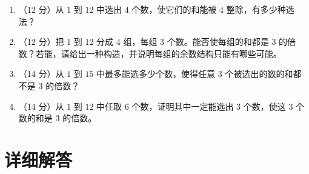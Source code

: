 \documentclass[11pt,a4paper,fontset=fandol]{ctexart}
\newcommand{\biganswerspace}{\vspace{3.2cm}}
\begin{document}
\begin{enumerate}
  \item （12 分）从 $1$ 到 $12$ 中选出 $4$ 个数，使它们的和能被 $4$ 整除，有多少种选法？
  \biganswerspace

  \item （12 分）把 $1$ 到 $12$ 分成 $4$ 组，每组 $3$ 个数。能否使每组的和都是 $3$ 的倍数？若能，请给出一种构造，并说明每组的余数结构只能有哪些可能。
  \biganswerspace

  \item （14 分）从 $1$ 到 $15$ 中最多能选多少个数，使得任意 $3$ 个被选出的数的和都不是 $3$ 的倍数？
  \biganswerspace

  \item （14 分）从 $1$ 到 $12$ 中任取 $6$ 个数，证明其中一定能选出 $3$ 个数，使这 $3$ 个数的和是 $3$ 的倍数。
  \biganswerspace
\end{enumerate}

\newpage
\section{详细解答}
\end{document}
